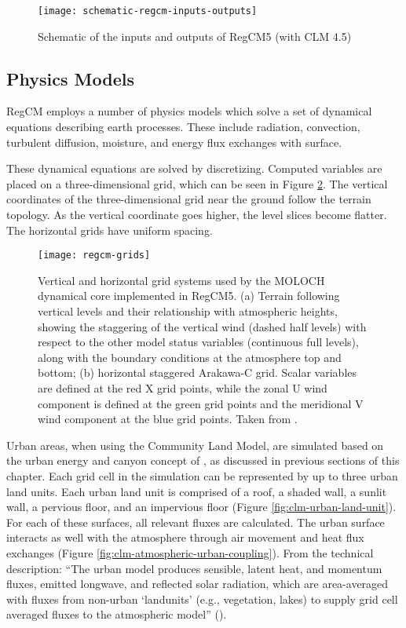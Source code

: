 		\begin{figure}	
			\centering
			\texttt{[image: schematic-regcm-inputs-outputs]}
			\caption{
				Schematic of the inputs and outputs of RegCM5 (with CLM 4.5)
			}
			\label{fig:schematic-regcm-inputs-outputs}
		\end{figure}
	
	\subsection{Physics Models}
		RegCM employs a number of physics models which solve a set of dynamical equations describing earth processes.
		These include radiation, convection, turbulent diffusion, moisture, and energy flux exchanges with surface.
		
		These dynamical equations are solved by discretizing. Computed variables are placed on a three-dimensional grid, which can be seen in Figure \ref{fig:regcm-grids}.
		The vertical coordinates of the three-dimensional grid near the ground follow the terrain topology. 
		As the vertical coordinate goes higher, the level slices become flatter.
		The horizontal grids have uniform spacing.
		\begin{figure}	
			\centering
			\texttt{[image: regcm-grids]}
			\caption{
				Vertical and horizontal grid systems used by the MOLOCH dynamical core implemented in RegCM5.
				(a) Terrain following vertical levels and their relationship with atmospheric heights, showing the staggering of the vertical wind (dashed half levels) with respect to the other model status variables (continuous full levels), along with the boundary conditions at the atmosphere top and bottom;
				(b) horizontal staggered Arakawa-C grid.
				Scalar variables are defined at the red X grid points, while the zonal U wind component is defined at the green grid points and the meridional V wind component at the blue grid points.
				Taken from \textcite{Giorgi2023}.
			}
			\label{fig:regcm-grids}
		\end{figure}
		
		Urban areas, when using the Community Land Model, are simulated based on the urban energy and canyon concept of \textcite{Oke2002}, as discussed in previous sections of this chapter.
		Each grid cell in the simulation can be represented by up to three urban land units.
		Each urban land unit is comprised of a roof, a shaded wall, a sunlit wall, a pervious floor, and an impervious floor (Figure \ref{fig:clm-urban-land-unit}).
		For each of these surfaces, all relevant fluxes are calculated.
		The urban surface interacts as well with the atmosphere through air movement and heat flux exchanges (Figure \ref{fig:clm-atmospheric-urban-coupling}).
		From the technical description:
		``The urban model produces sensible, latent heat, and momentum fluxes, emitted longwave, and reflected solar radiation, which are area-averaged with fluxes from non-urban `landunits' (e.g., vegetation, lakes) to supply grid cell averaged fluxes to the atmospheric model'' (\cite[p. 241]{Oleson2013}).
		
